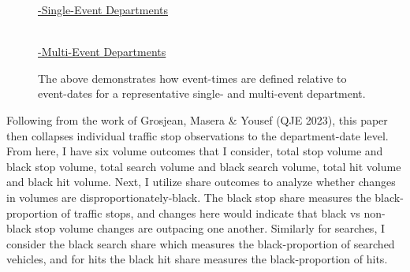 \documentclass[12pt,a4paper]{article}
\begin{document}
\begin{figure}
	\begin{center}
		\noindent \underline{-Single-Event Departments} \\
		 \\
		\underline{-Multi-Event Departments} \\
		\caption[Event Timing Dragram]{The above demonstrates how event-times are defined relative to event-dates for a representative single- and multi-event department.}
		\label{etime_diagram}
	\end{center}
\end{figure}

Following from the work of Grosjean, Masera \& Yousef (QJE 2023), this paper then collapses individual traffic stop observations to the department-date level. From here, I have six volume outcomes that I consider, total stop volume and black stop volume, total search volume and black search volume, total hit volume and black hit volume. Next, I utilize share outcomes to analyze whether changes in volumes are disproportionately-black. The black stop share measures the black-proportion of traffic stops, and changes here would indicate that black vs non-black stop volume changes are outpacing one another. Similarly for searches, I consider the black search share which measures the black-proportion of searched vehicles, and for hits the black hit share measures the black-proportion of hits. \\
\end{document}

